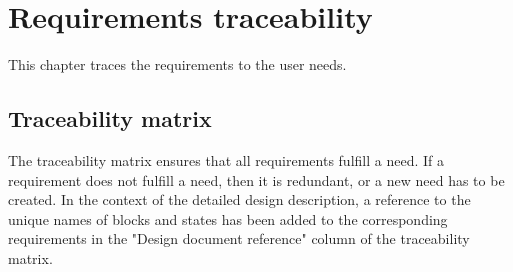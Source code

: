 \chapter{Requirements traceability}
\label{chap:req_trace}
This chapter traces the requirements to the user needs.

\section{Traceability matrix}
The traceability matrix ensures that all requirements fulfill a need. If a requirement does not fulfill a need, then it is redundant, or a new need has to be created.
In the context of the detailed design description, a reference to the unique names of blocks and states has been added to the corresponding requirements in the "Design document reference" column of the traceability matrix. 

